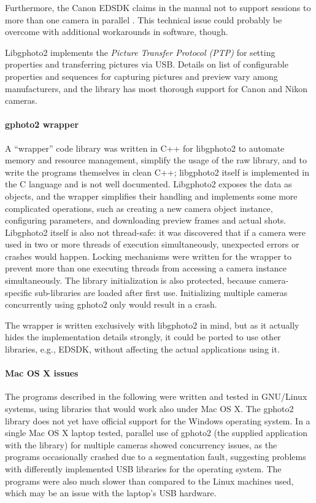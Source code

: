 Furthermore, the Canon EDSDK claims in the manual not to support sessions to more than one camera in parallel \cite{canonedsdk}.
This technical issue could probably be overcome with additional workarounds in software, though.

Libgphoto2 implements the \emph{Picture Transfer Protocol (PTP)} \cite{ptp} for setting properties and transferring pictures via USB.
Details on list of configurable properties and sequences for capturing pictures and preview vary among manufacturers, and the library has most thorough support for Canon and Nikon cameras.

\paragraph{gphoto2 wrapper}
A ``wrapper'' code library was written in C++ for libgphoto2 to automate memory and resource management, simplify the usage of the raw library, and to write the programs themselves in clean C++; libgphoto2 itself is implemented in the C language and is not well documented.
Libgphoto2 exposes the data as objects, and the wrapper simplifies their handling and implements some more complicated operations, such as creating a new camera object instance, configuring parameters, and downloading preview frames and actual shots.
Libgphoto2 itself is also not thread-safe: it was discovered that if a camera were used in two or more threads of execution simultaneously, unexpected errors or crashes would happen.
Locking mechanisms were written for the wrapper to prevent more than one executing threads from accessing a camera instance simultaneously.
The library initialization is also protected, because camera-specific sub-libraries are loaded after first use.
Initializing multiple cameras concurrently using gphoto2 only would result in a crash.

The wrapper is written exclusively with libgphoto2 in mind, but as it actually hides the implementation details strongly, it could be ported to use other libraries, e.g., EDSDK, without affecting the actual applications using it.

\paragraph{Mac OS X issues}
The programs described in the following were written and tested in GNU/Linux systems, using libraries that would work also under Mac OS X.
The gphoto2 library does not yet have official support for the Windows operating system.
In a single Mac OS X laptop tested, parallel use of gphoto2 (the supplied application with the library) for multiple cameras showed concurrency issues, as the programs occasionally crashed due to a segmentation fault, suggesting problems with differently implemented USB libraries for the operating system.
The programs were also much slower than compared to the Linux machines used, which may be an issue with the laptop's USB hardware.

